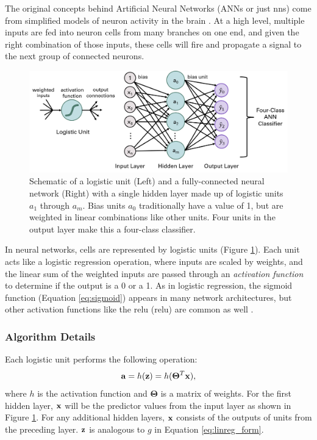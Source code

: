 The original concepts behind Artificial Neural Networks (ANNs or just \acrshort{nn}s) come from simplified models of neuron activity in the brain \citep[p.\ 394]{hastie_elements_2009}. At a high level, multiple inputs are fed into neuron cells from many branches on one end, and given the right combination of those inputs, these cells will fire and propagate a signal to the next group of connected neurons.
\begin{figure}[H]
\centering
\includegraphics[width=\textwidth]{templates/images/Figure-ANN_schematic.png}
\caption[Neural network schematic]{Schematic of a logistic unit (Left) and a fully-connected neural network (Right) with a single hidden layer made up of logistic units $a_1$ through $a_m$. Bias units $a_0$ traditionally have a value of 1, but are weighted in linear combinations like other units. Four units in the output layer make this a four-class classifier.}
\label{fig:nn_schematic}
\end{figure}

In neural networks, cells are represented by logistic units (Figure \ref{fig:nn_schematic}). Each unit acts like a logistic regression operation, where inputs are scaled by weights, and the linear sum of the weighted inputs are passed through an \textit{activation function} to determine if the output is a 0 or a 1. As in logistic regression, the sigmoid function (Equation \ref{eq:sigmoid}) appears in many network architectures, but other activation functions like the \acrlong{relu} (\acrshort{relu}) are common as well \citep{brownlee_gentle_2019}.

\subsubsection{Algorithm Details} \label{ch3:ann_details}

Each logistic unit performs the following operation:
\begin{equation}
\label{eq:nn_activation}
    {\bf{a}} = h({\bf{z}}) = h({\boldsymbol\Theta}^T{\bf x}),
\end{equation}
where $h$ is the activation function and $\boldsymbol\Theta$ is a matrix of weights. For the first hidden layer, $\bf{x}$ will be the predictor values from the input layer as shown in Figure \ref{fig:nn_schematic}. For any additional hidden layers, $\bf{x}$ consists of the outputs of units from the preceding layer. $\bf{z}$ is analogous to \(g\) in Equation \ref{eq:linreg_form}.

